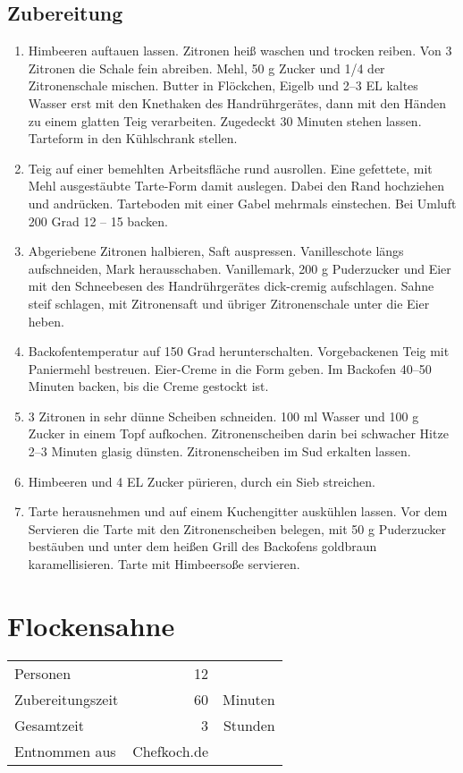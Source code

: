 \subsection*{Zubereitung}
\begin{enumerate}
	\item Himbeeren auftauen lassen. Zitronen heiß waschen und trocken reiben. Von 3 Zitronen die Schale fein abreiben. Mehl, 50 g Zucker und 1/4 der Zitronenschale mischen. Butter in Flöckchen, Eigelb und 2–3 EL kaltes Wasser erst mit den Knethaken des Handrührgerätes, dann mit den Händen zu einem glatten Teig verarbeiten. Zugedeckt 30 Minuten stehen lassen. Tarteform in den Kühlschrank stellen.
	\item Teig auf einer bemehlten Arbeitsfläche rund ausrollen. Eine gefettete, mit Mehl ausgestäubte Tarte-Form damit auslegen. Dabei den Rand hochziehen und andrücken. Tarteboden mit einer Gabel mehrmals einstechen. Bei Umluft 200 Grad 12 -- 15 backen. 
	\item Abgeriebene Zitronen halbieren, Saft auspressen. Vanilleschote längs aufschneiden, Mark herausschaben. Vanillemark, 200 g Puderzucker und Eier mit den Schneebesen des Handrührgerätes dick-cremig aufschlagen. Sahne steif schlagen, mit Zitronensaft und übriger Zitronenschale unter die Eier heben.
	\item Backofentemperatur auf 150 Grad herunterschalten. Vorgebackenen Teig mit Paniermehl bestreuen. Eier-Creme in die Form geben. Im  Backofen 40–50 Minuten backen, bis die Creme gestockt ist. 
	\item 3 Zitronen in sehr dünne Scheiben schneiden. 100 ml Wasser und 100 g Zucker in einem Topf aufkochen. Zitronenscheiben darin bei schwacher Hitze 2–3 Minuten glasig dünsten. Zitronenscheiben im Sud erkalten lassen.
	\item Himbeeren und 4 EL Zucker pürieren, durch ein Sieb streichen.
	\item  Tarte herausnehmen und auf einem Kuchengitter auskühlen lassen. Vor dem Servieren die Tarte mit den Zitronenscheiben belegen, mit 50 g Puderzucker bestäuben und unter dem heißen Grill des Backofens goldbraun karamellisieren. Tarte mit Himbeersoße servieren.
\end{enumerate}


\section{Flockensahne} 

\begin{tabular}{lrr}
	Personen         &                12 &  \\
	Zubereitungszeit &               60 & Minuten \\
	Gesamtzeit       &                3   & Stunden \\
	Entnommen aus    & Chefkoch.de &
\end{tabular} 

